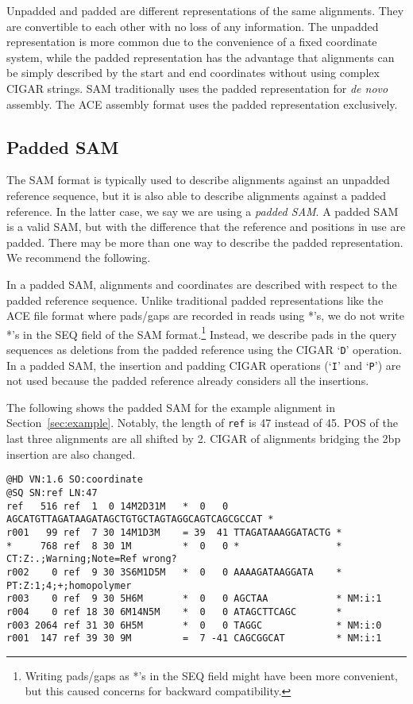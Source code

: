 \documentclass[10pt]{article}
\begin{document}
Unpadded and padded are different representations of the same alignments. They
are convertible to each other with no loss of any information. The unpadded
representation is more common due to the convenience of a fixed coordinate system,
while the padded representation has the advantage that alignments can be simply
described by the start and end coordinates without using complex CIGAR strings.
SAM traditionally uses the padded representation for {\it de novo} assembly.
The ACE assembly format uses the padded representation exclusively.

\subsection{Padded SAM}\label{sec:padded-sam}

The SAM format is typically used to describe alignments against an unpadded
reference sequence, but it is also able to describe alignments against a padded
reference. In the latter case, we say we are using a \emph{padded SAM}. A padded
SAM is a valid SAM, but with the difference that the reference and positions in
use are padded. There may be more than one way to describe the padded
representation. We recommend the following.

In a padded SAM, alignments and coordinates are described with respect to the
padded reference sequence. Unlike traditional padded representations like
the ACE file format where pads/gaps are recorded in reads using *'s, we do
not write *'s in the {\sf SEQ} field of the SAM format.\footnote{Writing
pads/gaps as *'s in the {\sf SEQ} field might have been more convenient, but
this caused concerns for backward compatibility.} Instead, we describe pads
in the query sequences as deletions from the padded reference using the
{\sf CIGAR} `{\tt D}' operation. In a padded SAM, the insertion and padding
CIGAR operations (`{\tt I}' and `{\tt P}') are not used because the padded
reference already considers all the insertions.

The following shows the padded SAM for the example alignment in Section~\ref{sec:example}.
Notably, the length of {\tt ref} is 47 instead of 45. {\sf POS} of the last
three alignments are all shifted by 2. {\sf CIGAR} of alignments bridging the
2bp insertion are also changed.

\begin{framed}\small
\begin{verbatim}
@HD VN:1.6 SO:coordinate
@SQ SN:ref LN:47
ref   516 ref  1  0 14M2D31M   *  0   0 AGCATGTTAGATAAGATAGCTGTGCTAGTAGGCAGTCAGCGCCAT *
r001   99 ref  7 30 14M1D3M    = 39  41 TTAGATAAAGGATACTG *
*     768 ref  8 30 1M         *  0   0 *                 * CT:Z:.;Warning;Note=Ref wrong?
r002    0 ref  9 30 3S6M1D5M   *  0   0 AAAAGATAAGGATA    * PT:Z:1;4;+;homopolymer
r003    0 ref  9 30 5H6M       *  0   0 AGCTAA            * NM:i:1
r004    0 ref 18 30 6M14N5M    *  0   0 ATAGCTTCAGC       *
r003 2064 ref 31 30 6H5M       *  0   0 TAGGC             * NM:i:0
r001  147 ref 39 30 9M         =  7 -41 CAGCGGCAT         * NM:i:1
\end{verbatim}
\end{framed}
\end{document}
